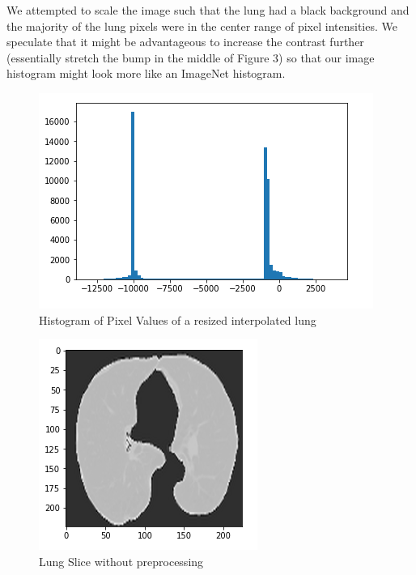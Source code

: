 \documentclass[twocolumn,10pt]{article}
\begin{document}
We attempted to scale the image such that the lung had a black background and the majority
of the lung pixels were in the center range of pixel intensities. We speculate that it might
be advantageous to increase the contrast further (essentially stretch the bump in the middle
of Figure 3) so that our image histogram might look more like an ImageNet histogram.

\begin{figure}[h!]
  \label{fig:Uninterpreted Histogram}
  \includegraphics[width=\columnwidth]{img/hu_histogram.png}
  \caption{Histogram of Pixel Values of a resized interpolated lung}
\end{figure}
\begin{figure}[h!]
  \includegraphics[width=\columnwidth]{img/slice_no_preprocessing.png}
  \caption{Lung Slice without preprocessing}
\end{figure}
\end{document}
